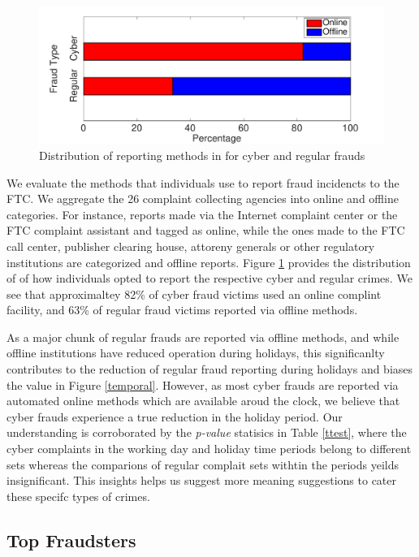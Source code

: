 \documentclass[conference]{IEEEtran}
\begin{document}
\begin{figure}
\centering
  \includegraphics[scale=0.35]{graphics/reporting_methods.pdf}
  \caption{Distribution of reporting methods in for cyber and regular frauds}
  \label{reportingfig}
\end{figure}

We evaluate the methods that individuals use to report fraud incidencts to the FTC. We aggregate the 26 complaint collecting agencies into online and offline categories. For instance, reports made via the Internet complaint center or the FTC complaint assistant and tagged as online, while the ones made to the FTC call center, publisher clearing house, attoreny generals or other regulatory institutions are categorized and offline reports. Figure \ref{reportingfig} provides the distribution of of how individuals opted to report the respective cyber and regular crimes. We see that approximaltey 82\% of cyber fraud victims used an online complint facility, and 63\% of regular fraud victims reported via offline methods.

As a major chunk of regular frauds are reported via offline methods, and while offline institutions have reduced operation during holidays, this significanlty contributes to the reduction of regular fraud reporting during holidays and biases the value in Figure \ref{temporal}. However, as most cyber frauds are reported via automated online methods which are available aroud the clock, we believe that cyber frauds experience a true reduction in the holiday period. Our understanding is corroborated by the \emph{p-value} statisics in Table \ref{ttest}, where the cyber complaints in the working day and holiday time periods belong to different sets whereas the comparions of regular complait sets withtin the periods yeilds insignificant. This insights helps us suggest more meaning suggestions to cater these specifc types of crimes.


\subsection{Top Fraudsters}\label{reportingmethods}
\end{document}
